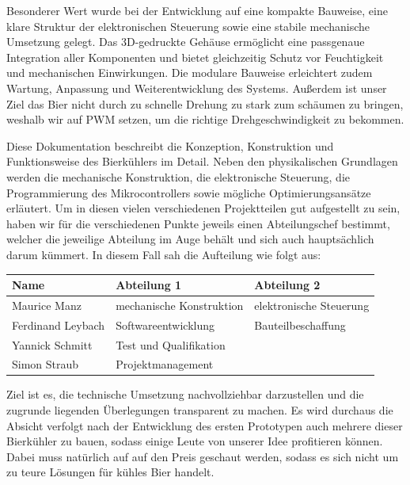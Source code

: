 Besonderer Wert wurde bei der Entwicklung auf eine kompakte Bauweise, eine klare Struktur der elektronischen Steuerung sowie eine stabile mechanische Umsetzung gelegt. Das 3D-gedruckte Gehäuse ermöglicht eine passgenaue Integration aller Komponenten und bietet gleichzeitig Schutz vor Feuchtigkeit und mechanischen Einwirkungen. Die modulare Bauweise erleichtert zudem Wartung, Anpassung und Weiterentwicklung des Systems. Außerdem ist unser Ziel das Bier nicht durch zu schnelle Drehung zu stark zum schäumen zu bringen, weshalb wir auf PWM setzen, um die richtige Drehgeschwindigkeit zu bekommen. 

Diese Dokumentation beschreibt die Konzeption, Konstruktion und Funktionsweise des Bierkühlers im Detail. Neben den physikalischen Grundlagen werden die mechanische Konstruktion, die elektronische Steuerung, die Programmierung des Mikrocontrollers sowie mögliche Optimierungsansätze erläutert. Um in diesen vielen verschiedenen Projektteilen gut aufgestellt zu sein, haben wir für die verschiedenen Punkte jeweils einen Abteilungschef bestimmt, welcher die jeweilige Abteilung im Auge behält und sich auch hauptsächlich darum kümmert. In diesem Fall sah die Aufteilung wie folgt aus:

\begin{tabular}{lll}
	\toprule
	\textbf{Name} & \textbf{Abteilung 1} & \textbf{Abteilung 2} \\
	\midrule
	Maurice Manz & mechanische Konstruktion & elektronische Steuerung \\
	Ferdinand Leybach & Softwareentwicklung & Bauteilbeschaffung \\
	Yannick Schmitt & Test und Qualifikation & \\
	Simon Straub & Projektmanagement & \\
	\bottomrule
\end{tabular}




 Ziel ist es, die technische Umsetzung nachvollziehbar darzustellen und die zugrunde liegenden Überlegungen transparent zu machen. Es wird durchaus die Absicht verfolgt nach der Entwicklung des ersten Prototypen auch mehrere dieser Bierkühler zu bauen, sodass einige Leute von unserer Idee profitieren können. Dabei muss natürlich auf auf den Preis geschaut werden, sodass es sich nicht um zu teure Lösungen für kühles Bier handelt.